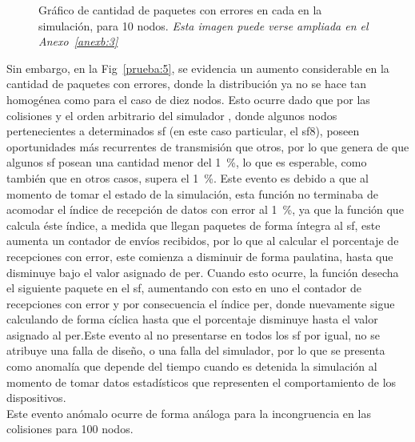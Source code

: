 \begin{justify}
\begin{figure}[!ht]
\caption{Gráfico de cantidad de paquetes con errores en cada  en la simulación, para 10 nodos. \textit{Esta imagen puede verse ampliada en el Anexo~\ref{anexb:3}}}
\label{prueba:4}
\end{figure}\newpage \noindent
Sin embargo, en la Fig~\ref{prueba:5}, se evidencia un aumento considerable en la cantidad de paquetes con errores, donde la distribución ya no se hace tan homogénea como para el caso de diez nodos. Esto ocurre dado que por las colisiones y el orden arbitrario del simulador \OMNET, donde algunos nodos pertenecientes a determinados \gls{sf} (en este caso particular, el \gls{sf}\num{8}), poseen oportunidades más recurrentes de transmisión que otros, por lo que genera de que algunos \gls{sf} posean una cantidad menor del \SI{1}{\percent}, lo que es esperable, como también que en otros casos, supera el \SI{1}{\percent}. Este evento es debido a que al momento de tomar el estado de la simulación, esta función no terminaba de acomodar el índice de recepción de datos con error al \SI{1}{\percent}, ya que la función que calcula éste índice, a medida que llegan paquetes de forma íntegra al \gls{sf}, este aumenta un contador de envíos recibidos, por lo que al calcular el porcentaje de recepciones con error, este comienza a disminuir de forma paulatina, hasta que disminuye bajo el valor asignado de \gls{per}. Cuando esto ocurre, la función desecha el siguiente paquete en el \gls{sf}, aumentando con esto en uno el contador de recepciones con error y por consecuencia el índice \gls{per}, donde nuevamente sigue calculando de forma cíclica hasta que el porcentaje disminuye hasta el valor asignado al \gls{per}.\newpage \noindent Este evento al no presentarse en todos los \gls{sf} por igual, no se atribuye una falla de diseño, o una falla del simulador, por lo que se presenta como anomalía que depende del tiempo cuando es detenida la simulación al momento de tomar datos estadísticos que representen el comportamiento de los dispositivos.\\
Este evento anómalo ocurre de forma análoga para la incongruencia en las colisiones para 100 nodos.


\end{justify}
